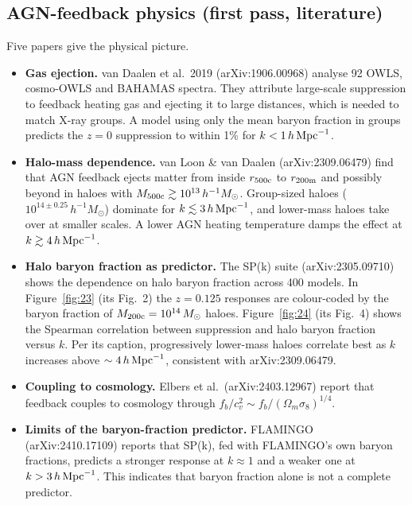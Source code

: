 \documentclass[11pt,a4paper]{article}
\begin{document}
\subsection{AGN-feedback physics (first pass, literature)}
Five papers give the physical picture.
\begin{itemize}
\item \textbf{Gas ejection.} van Daalen et al.\ 2019 (arXiv:1906.00968) analyse 92 OWLS, cosmo-OWLS and BAHAMAS spectra. They attribute large-scale suppression to feedback heating gas and ejecting it to large distances, which is needed to match X-ray groups. A model using only the mean baryon fraction in groups predicts the $z=0$ suppression to within 1\% for $k<1\,h\,{\rm Mpc}^{-1}$.
\item \textbf{Halo-mass dependence.} van Loon \& van Daalen (arXiv:2309.06479) find that AGN feedback ejects matter from inside $r_{\rm 500c}$ to $r_{\rm 200m}$ and possibly beyond in haloes with $M_{\rm 500c}\gtrsim10^{13}\,h^{-1}M_\odot$. Group-sized haloes ($10^{14\pm0.25}\,h^{-1}M_\odot$) dominate for $k\lesssim3\,h\,{\rm Mpc}^{-1}$, and lower-mass haloes take over at smaller scales. A lower AGN heating temperature damps the effect at $k\gtrsim4\,h\,{\rm Mpc}^{-1}$.
\item \textbf{Halo baryon fraction as predictor.} The SP(k) suite (arXiv:2305.09710) shows the dependence on halo baryon fraction across 400 models. In Figure~\ref{fig:23} (its Fig.~2) the $z=0.125$ responses are colour-coded by the baryon fraction of $M_{\rm 200c}=10^{14}\,M_\odot$ haloes. Figure~\ref{fig:24} (its Fig.~4) shows the Spearman correlation between suppression and halo baryon fraction versus $k$. Per its caption, progressively lower-mass haloes correlate best as $k$ increases above $\sim4\,h\,{\rm Mpc}^{-1}$, consistent with arXiv:2309.06479.
\item \textbf{Coupling to cosmology.} Elbers et al.\ (arXiv:2403.12967) report that feedback couples to cosmology through $f_b/c_v^2\sim f_b/(\Omega_m\sigma_8)^{1/4}$.
\item \textbf{Limits of the baryon-fraction predictor.} FLAMINGO (arXiv:2410.17109) reports that SP(k), fed with FLAMINGO's own baryon fractions, predicts a stronger response at $k\approx1$ and a weaker one at $k>3\,h\,{\rm Mpc}^{-1}$. This indicates that baryon fraction alone is not a complete predictor.
\end{itemize}
\end{document}
